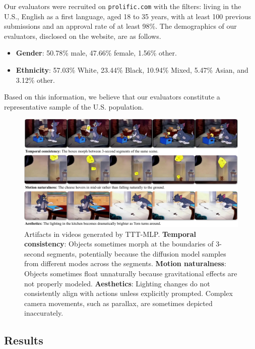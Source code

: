 Our evaluators were recruited on \texttt{prolific.com} with the filters: living in the U.S., English as a first language, aged 18 to 35 years, with at least 100 previous submissions and an approval rate of at least 98\%.
The demographics of our evaluators, disclosed on the website, are as follows.
\vspace{0.2em}
\begin{itemize}[itemsep=0.2em]
\item \textbf{Gender}: 50.78\% male, 47.66\% female, 1.56\% other.
\item \textbf{Ethnicity}: 57.03\% White, 23.44\% Black, 10.94\% Mixed, 5.47\% Asian, and 3.12\% other. 
\end{itemize}
Based on this information, we believe that our evaluators constitute a representative sample of the U.S. population.

\begin{figure}[!t]
    \centering
    \includegraphics[width=\textwidth]{figs/limitations.pdf}
    \vspace{-10pt}
    \caption{Artifacts in videos generated by TTT-MLP. 
    \textbf{Temporal consistency}: Objects sometimes morph at the boundaries of 3-second segments, potentially because the diffusion model samples from different modes across the segments.
    \textbf{Motion naturalness}: Objects sometimes float unnaturally because gravitational effects are not properly modeled.
    \textbf{Aesthetics}: Lighting changes do not consistently align with actions unless explicitly prompted. 
    Complex camera movements, such as parallax, are sometimes depicted inaccurately.
    }
    \label{fig:limitations}
\end{figure}

\subsection{Results}
\label{subsec:results}

